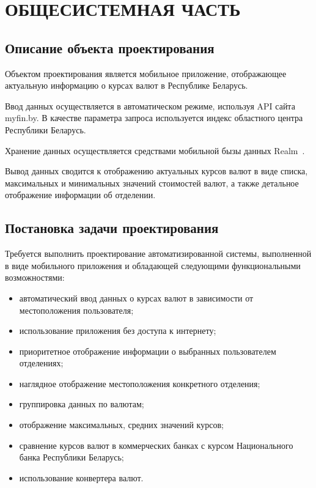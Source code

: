 \section[Общесистемная часть]{ОБЩЕСИСТЕМНАЯ ЧАСТЬ}

\subsection{Описание объекта проектирования}

Объектом проектирования является мобильное приложение,
отображающее актуальную информацию о курсах валют
в Республике Беларусь.

Ввод данных осуществляется в автоматическом режиме,
используя API сайта myfin.by. В качестве параметра запроса
используется индекс областного центра Республики Беларусь.

Хранение данных осуществляется средствами мобильной бызы данных Realm~\cite{realm}.

Вывод данных сводится к отображению актуальных курсов валют в виде списка,
максимальных и минимальных значений стоимостей валют,
а также детальное отображение информации об отделении.


\subsection{Постановка задачи проектирования}

Требуется выполнить проектирование автоматизированной системы,
выполненной в виде мобильного приложения и обладающей следующими
функциональными возможностями:
\begin{itemize}
  \item автоматический ввод данных о курсах валют в зависимости
    от местоположения пользователя;  
  \item использование приложения без доступа к интернету;
  \item приоритетное отображение информации о выбранных пользователем отделениях; 
  \item наглядное отображение местоположения конкретного отделения;
  \item группировка данных по валютам;
  \item отображение максимальных, средних значений курсов;
  \item сравнение курсов валют в коммерческих банках
    с курсом Национального банка Республики Беларусь;
  \item использование конвертера валют.
\end{itemize}

